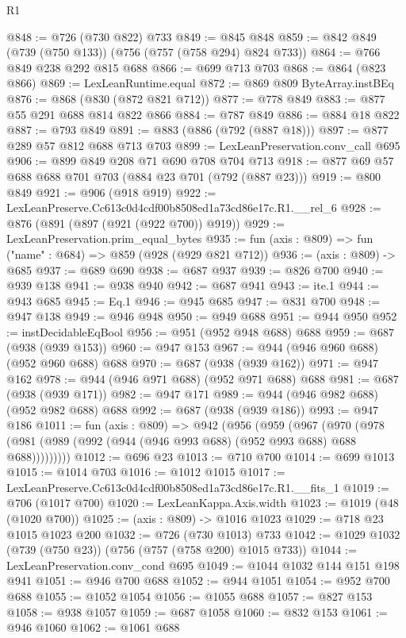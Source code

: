 \begin{lexlean}{R1}
\begin{coremodule}
@848 := @726 (@730 @822) @733
@849 := @845 @848
@859 := @842 @849 (@739 (@750 @133)) (@756 (@757 (@758 @294) @824 @733))
@864 := @766 @849 @238 @292 @815 @688
@866 := @699 @713 @703
@868 := @864 (@823 @866)
@869 := LexLeanRuntime.equal
@872 := @869 @809 ByteArray.instBEq
@876 := @868 (@830 (@872 @821 @712))
@877 := @778 @849
@883 := @877 @55 @291 @688 @814 @822 @866
@884 := @787 @849
@886 := @884 @18 @822
@887 := @793 @849
@891 := @883 (@886 (@792 (@887 @18)))
@897 := @877 @289 @57 @812 @688 @713 @703
@899 := LexLeanPreservation.conv_call @695
@906 := @899 @849 @208 @71 @690 @708 @704 @713
@918 := @877 @69 @57 @688 @688 @701 @703 (@884 @23 @701 (@792 (@887 @23)))
@919 := @800 @849
@921 := @906 (@918 @919)
@922 := LexLeanPreserve.Cc613c0d4cdf00b8508ed1a73cd86e17c.R1.__rel_6
@928 := @876 (@891 (@897 (@921 (@922 @700)) @919))
@929 := LexLeanPreservation.prim_equal_bytes
@935 := fun (axis : @809) => fun ("name" : @684) => @859 (@928 (@929 @821 @712))
@936 := (axis : @809) -> @685
@937 := @689 @690
@938 := @687 @937
@939 := @826 @700
@940 := @939 @138
@941 := @938 @940
@942 := @687 @941
@943 := ite.{1}
@944 := @943 @685
@945 := Eq.{1}
@946 := @945 @685
@947 := @831 @700
@948 := @947 @138
@949 := @946 @948
@950 := @949 @688
@951 := @944 @950
@952 := instDecidableEqBool
@956 := @951 (@952 @948 @688) @688
@959 := @687 (@938 (@939 @153))
@960 := @947 @153
@967 := @944 (@946 @960 @688) (@952 @960 @688) @688
@970 := @687 (@938 (@939 @162))
@971 := @947 @162
@978 := @944 (@946 @971 @688) (@952 @971 @688) @688
@981 := @687 (@938 (@939 @171))
@982 := @947 @171
@989 := @944 (@946 @982 @688) (@952 @982 @688) @688
@992 := @687 (@938 (@939 @186))
@993 := @947 @186
@1011 := fun (axis : @809) =>
  @942
    (@956
      (@959
        (@967
          (@970 (@978 (@981 (@989 (@992 (@944 (@946 @993 @688) (@952 @993 @688) @688 @688)))))))))
@1012 := @696 @23
@1013 := @710 @700
@1014 := @699 @1013
@1015 := @1014 @703
@1016 := @1012 @1015
@1017 := LexLeanPreserve.Cc613c0d4cdf00b8508ed1a73cd86e17c.R1.__fits_1
@1019 := @706 (@1017 @700)
@1020 := LexLeanKappa.Axis.width
@1023 := @1019 (@48 (@1020 @700))
@1025 := (axis : @809) -> @1016 @1023
@1029 := @718 @23 @1015 @1023 @200
@1032 := @726 (@730 @1013) @733
@1042 := @1029 @1032 (@739 (@750 @23)) (@756 (@757 (@758 @200) @1015 @733))
@1044 := LexLeanPreservation.conv_cond @695
@1049 := @1044 @1032 @144 @151 @198 @941
@1051 := @946 @700 @688
@1052 := @944 @1051
@1054 := @952 @700 @688
@1055 := @1052 @1054
@1056 := @1055 @688
@1057 := @827 @153
@1058 := @938 @1057
@1059 := @687 @1058
@1060 := @832 @153
@1061 := @946 @1060
@1062 := @1061 @688

\end{coremodule}
\end{lexlean}
